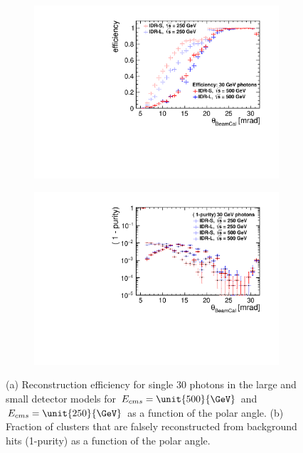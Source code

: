 \begin{figure}[htbp]
\begin{subfigure}{0.49\hsize}
 \includegraphics[width=\hsize]{Performance/fig/Eff_30GeVPhotons_different_detectors_differentCOMenergies.pdf}
 \caption{ \label{fig:perf:beamcal_eff}}
 \end{subfigure}
\begin{subfigure}{0.49\hsize}
 \includegraphics[width=\hsize]{Performance/fig/Fakes_30GeVPhotons_different_detectors_differentCOMenergies.pdf}
 \caption{  \label{fig:perf:beamcal_fake}}
 \end{subfigure}
\caption{ (a) Reconstruction efficiency for single \unit{30}{\GeV} photons in the large and small detector models for $E_{cms}=\unit{500}{\GeV}$  and
  $E_{cms}=\unit{250}{\GeV}$ as a function of the polar angle.
  (b) Fraction of clusters that are falsely reconstructed from background hits (1-purity) as a function of the polar angle. 
}
\label{fig:perf:beamcal}
\end{figure}

